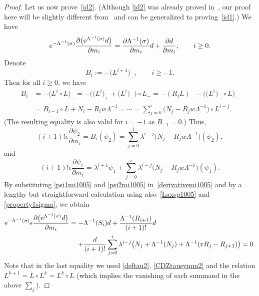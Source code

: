 \documentclass[pdftex]{sigma}
\newcommand{\e}{\epsilon}
\newcommand{\p}{\partial}
\newcommand{\nn}{\nonumber}
\newcommand{\beq}{\begin{equation}}
\newcommand{\eeq}{\end{equation}}
\numberwithin{equation}{section}
\begin{document}
\begin{proof}
Let us now prove~\eqref{id2}. (Although \eqref{id2} was already proved in~\cite{Y},
our proof here will be slightly different from~\cite{Y} and can be generalized to proving~\eqref{id1}.)
We have
\beq\label{derivativemi1005}
{\rm e}^{-\Lambda^{-1}(\sigma)}\frac{\p \bigl({\rm e}^{\Lambda^{-1}(\sigma)}d\bigr)}{\p m_i}
= \frac{\p \Lambda^{-1}(\sigma)}{\p m_i} d + \frac{\p d}{\p m_i}, \qquad i\ge0.
\eeq
Denote
\[
B_i:= -\bigl(L^{i+1}\bigr)_-, \qquad i\ge-1.
\]
Then for all $i\ge0$, we have
\begin{align*}
B_i & = -\bigl(L^i\circ L\bigr)_- = - \bigl(\bigl(L^i\bigr)_+ + \bigl(L^i\bigr)_-\bigr) \circ L_-
 = - (R_i L)_- - \bigl(\bigl(L^i\bigr)_- \circ L\bigr)_- \nn\\
& = B_{i-1} \circ L + N_i - R_i w \Lambda^{-1} = \cdots
 = \sum_{j=0}^i \bigl(N_j-R_j w\Lambda^{-1}\bigr) \circ L^{i-j}. \nn
\end{align*}
(The resulting equality is also valid for $i=-1$ as $B_{-1}=0$.)
Thus,
\beq\label{psi2mi1005}
(i+1)! \e \frac{\p \psi_2}{\p m_i} = B_i (\psi_2) = \sum_{j=0}^i \lambda^{i-j} \bigl(N_j-R_j w\Lambda^{-1}\bigr) (\psi_2),
\eeq
and
\beq\label{psi1mi1005}
(i+1)! \e \frac{\p \psi_1}{\p m_i} %
=\lambda^{i+1} \psi_1
+ \sum_{j=0}^i \lambda^{i-j} \bigl(N_j-R_j w\Lambda^{-1}\bigr) (\psi_1).
\eeq
By substituting \eqref{psi1mi1005} and \eqref{psi2mi1005} in~\eqref{derivativemi1005}
and by a lengthy but straightforward calculation using also~\eqref{Laxsp1005} and \eqref{property1sigma}, we obtain
\begin{align*}
{\rm e}^{-\Lambda^{-1}(\sigma)} \e\frac{\p \bigl({\rm e}^{\Lambda^{-1}(\sigma)}d\bigr)}{\p m_i}
={}& {-}{} \Lambda^{-1}(S_{i}) d
+ \frac{\Lambda^{-1}(R_{i+1})}{(i+1)!} d \nn\\
&{}{+}{} \frac{d}{(i+1)!}\sum_{j=0}^i \lambda^{i-j} \bigl(N_j+\Lambda^{-1}(N_j)+\Lambda^{-1}(v R_j-R_{j+1})\bigr) = 0. \nn
\end{align*}
Note that in the last equality we used \eqref{deftau2}, \eqref{CDZtausymm2}
and the relation $L^{k+1}=L\circ L^k=L^k \circ L$ (which implies the vanishing of each
summand in the above $\sum_j$).


\end{proof}
\end{document}
